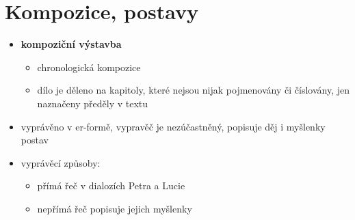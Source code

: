 \documentclass[10pt,a4paper]{article}
\begin{document}
\section*{Kompozice, postavy}
\begin{itemize}
\item \textbf{kompoziční výstavba}
	\begin{itemize}
	\item chronologická kompozice
	\item dílo je děleno na kapitoly, které nejsou nijak pojmenovány či číslovány, jen naznačeny předěly v textu
	\end{itemize}
\item vyprávěno v er-formě, vypravěč je nezúčastněný, popisuje děj i myšlenky postav
\item vyprávěcí způsoby:
	\begin{itemize}
	\item přímá řeč v dialozích Petra a Lucie
	\item nepřímá řeč popisuje jejich myšlenky
	\end{itemize}
\end{itemize}
\end{document}
